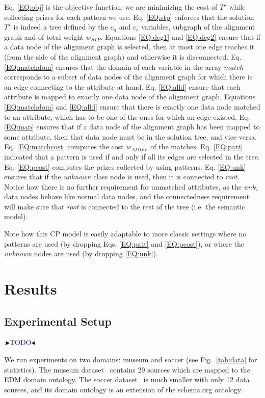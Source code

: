 \documentclass[letterpaper]{article} %
\newcommand{\authornote}[3]{
  {\fbox{\sc 
  #1}:$\blacktriangleright$\textcolor{#2}{\small{#3}}$\blacktriangleleft$}%
}
\newcommand{\ddg}[1]{\authornote{DDG}{blue}{#1}}
\begin{document}
Eq. \ref{EQ:obj} is the objective function: we are minimizing the cost 
of $T^\star$ while collecting prizes for each pattern we use. Eq. \ref{EQ:stp} 
enforces that the solution 
$T^\star$ is indeed a tree defined by the $c_n$ and $c_e$ variables, subgraph 
of the alignment graph 
and of total weight $w_{STP}$. Equations \ref{EQ:deg1} and \ref{EQ:deg2} ensure 
that if a data node of the alignment graph is selected, then at most one edge 
reaches it (from the side of the alignment graph) and otherwise it is 
disconnected. Eq. \ref{EQ:matchdom} ensures that the domain of each variable in 
the array $match$ corresponds to a subset of data nodes of the alignment graph 
for which there is an edge connecting to the attribute at hand. Eq. 
\ref{EQ:alld} ensure that each attribute is mapped to exactly one data node of 
the alignment graph. Equations \ref{EQ:matchdom} and \ref{EQ:alld} ensure that 
there is exactly one data node matched to an attribute, which has to be one of 
the ones for which an edge existed. Eq. \ref{EQ:map} ensures that 
if a data node of the alignment graph has been mapped to some attribute, then 
that data node must be in the solution tree, and vice-versa. Eq. 
\ref{EQ:matchcost} computes the cost $w_{ADIFF}$ of the matches.
Eq. \ref{EQ:patt} indicated that a pattern is used if and only if all its edges 
are selected in the tree. Eq. \ref{EQ:pcost} computes the prizes collected by using patterns.
Eq. \ref{EQ:unk} ensures that if the \emph{unknown} class node is used, then it 
is connected to \emph{root}.
Notice how there is no further requirement for unmatched attributes, as the 
$unk_i$ data nodes behave like normal data nodes, and the connectedness 
requirement will make sure that \emph{root} is connected to the rest of the 
tree (i.e. the semantic model).

Note how this CP model is easily adaptable to more classic settings where no 
patterns are used (by dropping Eqs. \ref{EQ:patt} and \ref{EQ:pcost}), or where 
the \emph{unknown} nodes are used (by dropping \ref{EQ:unk}).
\section{Results \label{SEC:Res}}

\subsection{Experimental Setup}
\ddg{TODO}

We run experiments on two domains: museum and soccer (see Fig.~\ref{tab:data} for statistics).
The museum dataset~\cite{taheriyan2016learning} contains 29 sources which are mapped to the EDM domain ontology.
The soccer dataset~\cite{Pham:semantic} is much smaller with only 12 data sources, and its domain ontology is an extension of the schema.org ontology.
\end{document}
